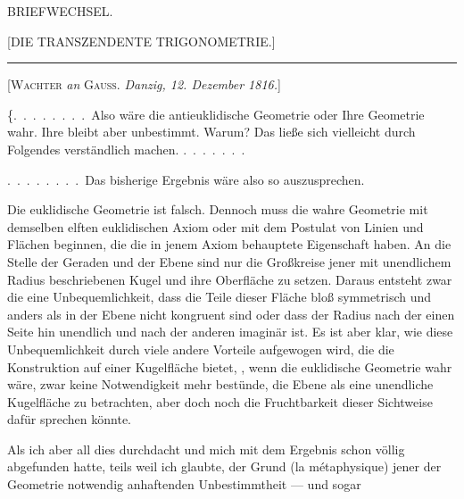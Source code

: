 \clearpage{}
\begin{center}
{\Large BRIEFWECHSEL.}
\end{center}

\bigskip
\begin{center}
[DIE TRANSZENDENTE TRIGONOMETRIE.]
\end{center}

\begin{center}\rule{2cm}{0.4pt}\end{center}

\begin{center}
[\textsc{Wachter} \emph{an} \textsc{Gauss}. \emph{Danzig, 12. Dezember 1816.}]
\end{center}

\{.\ .\ .\ .\ .\ .\ .\ .\ Also wäre die antieuklidische Geometrie oder Ihre Geometrie wahr.
Ihre  bleibt aber unbestimmt. Warum? Das ließe sich vielleicht durch
Folgendes verständlich machen. .\ .\ .\ .\ .\ .\ .

.\ .\ .\ .\ .\ .\ .\ .\ Das bisherige Ergebnis wäre also so auszusprechen.

Die
euklidische Geometrie ist falsch. Dennoch muss die wahre Geometrie mit
demselben elften euklidischen Axiom oder mit dem Postulat von Linien und Flächen
beginnen, die die in jenem Axiom behauptete Eigenschaft haben. An die Stelle der
Geraden und der Ebene sind nur die Großkreise jener mit unendlichem Radius beschriebenen Kugel
und ihre Oberfläche zu setzen. Daraus entsteht zwar die eine
Unbequemlichkeit, dass die Teile dieser Fläche bloß symmetrisch und anders als in
der Ebene nicht kongruent sind oder dass der Radius nach der einen Seite hin
unendlich und nach der anderen imaginär ist. Es ist aber klar, wie diese Unbequemlichkeit durch
viele andere Vorteile aufgewogen wird, die die Konstruktion auf einer Kugelfläche bietet,
, wenn die
euklidische Geometrie wahr wäre, zwar keine Notwendigkeit mehr bestünde,
die Ebene als eine unendliche Kugelfläche zu betrachten, aber doch noch die
Fruchtbarkeit dieser Sichtweise dafür sprechen könnte.

Als ich aber all dies durchdacht und mich mit dem Ergebnis schon
völlig abgefunden hatte, teils weil ich glaubte, der Grund (la métaphysique)
jener der Geometrie notwendig anhaftenden Unbestimmtheit --- und sogar
